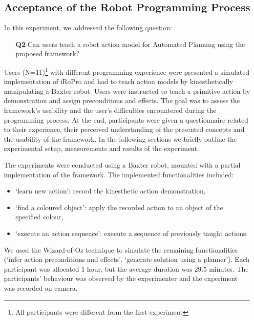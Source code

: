 \subsection{Acceptance of the Robot Programming Process} \label{sec:Exp2}
In this experiment, we addressed the following question:
\begin{enumerate}
	\item[\textbf{Q2}] Can users teach a robot action model for Automated Planning using the proposed framework?
\end{enumerate}
	Users (N=11)\footnote{All participants were different from the first experiment} with different programming experience were presented a simulated implementation of iRoPro and had to teach action models by kinesthetically manipulating a Baxter robot. 
	Users were instructed to teach a primitive action by demonstration and assign preconditions and effects.
	The goal was to assess the framework's usability and the user's difficulties encountered during the programming process.
	At the end, participants were given a questionnaire related to their experience, their perceived understanding of the presented concepts and the usability of the framework.
	In the following sections we briefly outline the experimental setup, measurements and results of the experiment.

The experiments were conducted using a Baxter robot, mounted with a partial implementation of the framework.
The implemented functionalities included:
\begin{itemize}
	\item `learn new action': record the kinesthetic action demonstration,
	\item `find a coloured object': apply the recorded action to an object of the specified colour,
	\item `execute an action sequence': execute a sequence of previously taught actions.
\end{itemize}

We used the Wizard-of-Oz technique to simulate the remaining functionalities (\eg `infer action preconditions and effects', `generate solution using a planner').
Each participant was allocated 1 hour, but the average duration was 29.5 minutes. 
The participants' behaviour was observed by the experimenter and the experiment was recorded on camera.

